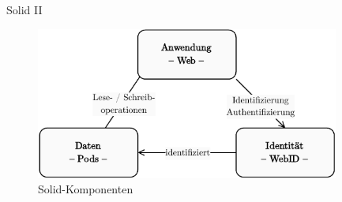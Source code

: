 \begin{frame}{Solid II \footnotesize\cite{mecklerWebLinkedData2023}}
    \vspace{1em}
    \begin{figure}
        \includegraphics[height=5cm]{./assets/solid_triangle.drawio.pdf}
        \caption{Solid-Komponenten}
    \end{figure}
\end{frame}


